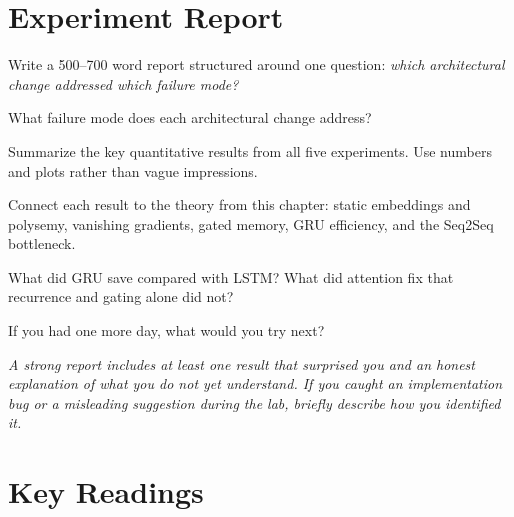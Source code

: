 \section*{Experiment Report}

Write a 500--700 word report structured around one question: \emph{which architectural change addressed which failure mode?}

\begin{description}[style=nextline, leftmargin=1.5em]
    \item[Question.] What failure mode does each architectural change address?
    \item[Evidence.] Summarize the key quantitative results from all five experiments. Use numbers and plots rather than vague impressions.
    \item[Diagnosis.] Connect each result to the theory from this chapter: static embeddings and polysemy, vanishing gradients, gated memory, GRU efficiency, and the Seq2Seq bottleneck.
    \item[Trade-offs.] What did GRU save compared with LSTM? What did attention fix that recurrence and gating alone did not?
    \item[Next step.] If you had one more day, what would you try next?
\end{description}

\noindent\textit{A strong report includes at least one result that surprised you and an honest explanation of what you do not yet understand. If you caught an implementation bug or a misleading suggestion during the lab, briefly describe how you identified it.}

\section*{Key Readings}

\nocite{bengio2003neural,mikolov2013efficient,pennington2014glove,hochreiter1997lstm,cho2014learning,sutskever2014sequence,bahdanau2015neural,luong2015effective,peters2018elmo,vaswani2017attention}

